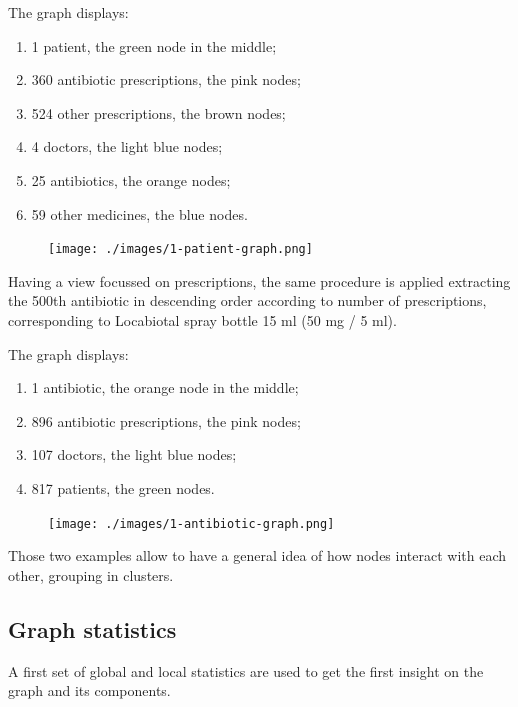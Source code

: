 The graph displays:
\begin{enumerate}
	\item 1 patient, the green node in the middle;
	\item 360 antibiotic prescriptions, the pink nodes;
	\item 524 other prescriptions, the brown nodes;
	\item 4 doctors, the light blue nodes;
	\item 25 antibiotics, the orange nodes;
	\item 59 other medicines, the blue nodes. 
\end{enumerate}

\begin{figure}[h]
	\centering
	\texttt{[image: ./images/1-patient-graph.png]}
\end{figure}

Having a view focussed on prescriptions, the same procedure is applied extracting the 500th antibiotic in descending order according to number of prescriptions, corresponding to Locabiotal spray bottle 15 ml (50 mg / 5 ml).

The graph displays:
\begin{enumerate}
	\item 1 antibiotic, the orange node in the middle;
	\item 896 antibiotic prescriptions, the pink nodes;
	\item 107 doctors, the light blue nodes;
	\item 817 patients, the green nodes.
\end{enumerate}

\begin{figure}[h]
	\centering
	\texttt{[image: ./images/1-antibiotic-graph.png]}
\end{figure}

Those two examples allow to have a general idea of how nodes interact with each other, grouping in clusters. 

\subsection{Graph statistics}
A first set of global and local statistics are used to get the first insight on the graph and its components.

